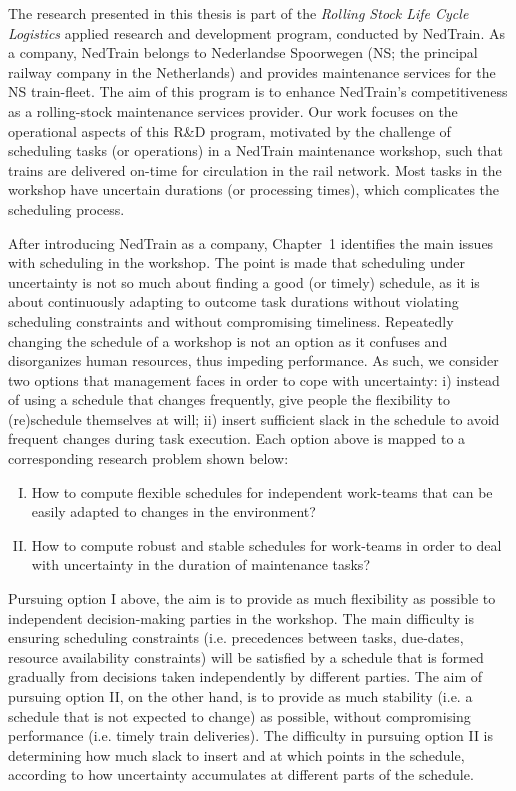 
The research presented in this thesis is part of the \emph{Rolling Stock Life Cycle Logistics} 
applied research and development program, conducted by NedTrain.
As a company, NedTrain belongs to Nederlandse Spoorwegen (NS; the principal railway company in the Netherlands) and 
provides maintenance services for the NS train-fleet.
The aim of this program is to enhance NedTrain's competitiveness as a rolling-stock maintenance services provider.
Our work focuses on the operational aspects of this R\&D program,
motivated by the challenge of scheduling tasks (or operations) in a NedTrain maintenance workshop,
such that trains are delivered on-time for circulation in the rail network.
Most tasks in the workshop have uncertain durations (or processing times), which complicates the scheduling process. 

After introducing NedTrain as a company,
Chapter~1 identifies the main issues with scheduling in the workshop.  
The point is made that scheduling under uncertainty is not so much about finding a good (or timely) schedule,
as it is about continuously adapting to outcome task durations without violating scheduling constraints and without compromising timeliness.
Repeatedly changing the schedule of a workshop is not an option as it confuses and disorganizes human resources, thus impeding performance.
As such, we consider two options that management faces in order to cope with uncertainty:
i) instead of using a schedule that changes frequently, give people the flexibility to (re)schedule themselves at will;
ii) insert sufficient slack in the schedule to avoid frequent changes during task execution.
Each option above is mapped to a corresponding research problem shown below:
\begin{enumerate}[(I)]
\item{How to compute flexible schedules for independent work-teams that can be easily adapted to changes in the environment?}
\item{How to compute robust and stable schedules for work-teams in order to deal with uncertainty in the duration of maintenance tasks?}
\end{enumerate}


Pursuing option I above,
the aim is to provide as much flexibility as possible to independent decision-making parties in the workshop.
The main difficulty is ensuring scheduling constraints (i.e. precedences between tasks, due-dates, resource availability constraints)
will be satisfied by a schedule that is formed gradually from decisions taken independently by different parties.
The aim of pursuing option II, on the other hand, 
is to provide as much stability (i.e. a schedule that is not expected to change) as possible, 
without compromising performance (i.e. timely train deliveries).
The difficulty in pursuing option II is determining how much slack to insert and at which points in the schedule,
according to how uncertainty accumulates at different parts of the schedule.

